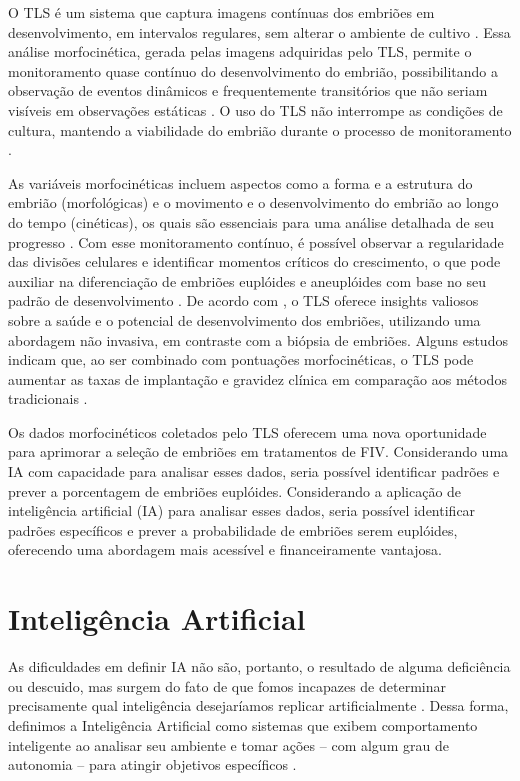 O TLS é um sistema que captura imagens contínuas dos embriões em desenvolvimento, em intervalos regulares, sem alterar o ambiente de cultivo \cite{moustakli2024}. Essa análise morfocinética, gerada pelas imagens adquiridas pelo TLS, permite o monitoramento quase contínuo do desenvolvimento do embrião, possibilitando a observação de eventos dinâmicos e frequentemente transitórios que não seriam visíveis em observações estáticas \cite{boucret2021}. O uso do TLS não interrompe as condições de cultura, mantendo a viabilidade do embrião durante o processo de monitoramento \cite{moustakli2024}.

As variáveis morfocinéticas incluem aspectos como a forma e a estrutura do embrião (morfológicas) e o movimento e o desenvolvimento do embrião ao longo do tempo (cinéticas), os quais são essenciais para uma análise detalhada de seu progresso \cite{gleicher2021}. Com esse monitoramento contínuo, é possível observar a regularidade das divisões celulares e identificar momentos críticos do crescimento, o que pode auxiliar na diferenciação de embriões euplóides e aneuplóides com base no seu padrão de desenvolvimento \cite{boucret2021}. De acordo com , o TLS oferece insights valiosos sobre a saúde e o potencial de desenvolvimento dos embriões, utilizando uma abordagem não invasiva, em contraste com a biópsia de embriões. Alguns estudos indicam que, ao ser combinado com pontuações morfocinéticas, o TLS pode aumentar as taxas de implantação e gravidez clínica em comparação aos métodos tradicionais \cite{boucret2021}.

Os dados morfocinéticos coletados pelo TLS oferecem uma nova oportunidade para aprimorar a seleção de embriões em tratamentos de FIV. Considerando uma IA com capacidade para analisar esses dados, seria possível identificar padrões e prever a porcentagem de embriões euplóides. Considerando a aplicação de inteligência artificial (IA) para analisar esses dados, seria possível identificar padrões específicos e prever a probabilidade de embriões serem euplóides, oferecendo uma abordagem mais acessível e financeiramente vantajosa.

\section{Inteligência Artificial}

As dificuldades em definir IA não são, portanto, o resultado de alguma deficiência ou descuido, mas surgem do fato de que fomos incapazes de determinar precisamente qual inteligência desejaríamos replicar artificialmente \cite{sheikh2023}. Dessa forma, definimos a Inteligência Artificial como sistemas que exibem comportamento inteligente ao analisar seu ambiente e tomar ações {–} com algum grau de autonomia {–} para atingir objetivos específicos \cite{sheikh2023}. 

